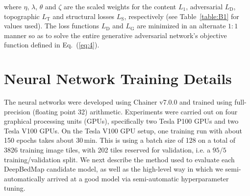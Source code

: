 \begin{appendices}
where $\eta$, $\lambda$, $\theta$ and $\zeta$ are the scaled weights for the content $L_1$, adversarial $L_{\mathrm{D}}$, topographic $L_{\mathrm{T}}$ and structural losses $L_{\mathrm{S}}$, respectively (see Table~\ref{table:B1} for values used).
The loss functions $L_{\mathrm{D}}$ and $L_{\mathrm{G}}$ are minimized in an alternate $1:1$ manner so as to solve the entire generative adversarial network's objective function defined in Eq.~(\ref{eq:4}).


\section{Neural Network Training Details} \label{appendix:B}

The neural networks were developed using Chainer v7.0.0 \citep{TokuiChainerDeepLearning2019} and trained using full-precision (floating point 32) arithmetic.
Experiments were carried out on four graphical processing units (GPUs), specifically two Tesla P100 GPUs and two Tesla V100 GPUs.
On the Tesla V100 GPU setup, one training run with about 150 epochs takes about 30\,min.
This is using a batch size of 128 on a total of 3826 training image tiles, with 202 tiles reserved for validation, i.e. a $95/5$ training/validation split.
We next describe the method used to evaluate each DeepBedMap candidate model, as well as the high-level way in which we semi-automatically arrived at a good model via semi-automatic hyperparameter tuning.


\end{appendices}
